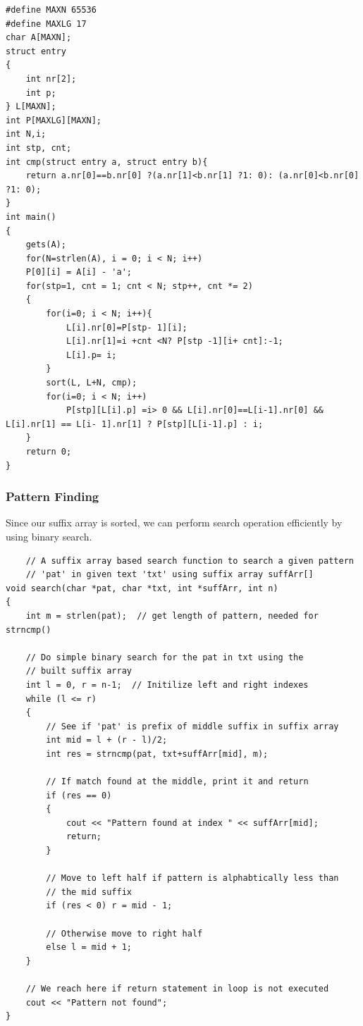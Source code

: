 \documentclass[12pt]{article}
\begin{document}
\begin{verbatim}
#define MAXN 65536
#define MAXLG 17
char A[MAXN];
struct entry
{
    int nr[2];
    int p;
} L[MAXN];
int P[MAXLG][MAXN];
int N,i;
int stp, cnt;
int cmp(struct entry a, struct entry b){
    return a.nr[0]==b.nr[0] ?(a.nr[1]<b.nr[1] ?1: 0): (a.nr[0]<b.nr[0] ?1: 0);
}
int main()
{
    gets(A);
    for(N=strlen(A), i = 0; i < N; i++)
    P[0][i] = A[i] - 'a';
    for(stp=1, cnt = 1; cnt < N; stp++, cnt *= 2)
    {
        for(i=0; i < N; i++){
            L[i].nr[0]=P[stp- 1][i];
            L[i].nr[1]=i +cnt <N? P[stp -1][i+ cnt]:-1;
            L[i].p= i;
        }
        sort(L, L+N, cmp);
        for(i=0; i < N; i++)
            P[stp][L[i].p] =i> 0 && L[i].nr[0]==L[i-1].nr[0] && L[i].nr[1] == L[i- 1].nr[1] ? P[stp][L[i-1].p] : i;
    }
    return 0;
}

\end{verbatim}

        \subsubsection{Pattern Finding}
        
        Since our suffix array is sorted, we can perform search operation efficiently by using binary search.
        
\begin{verbatim}
    // A suffix array based search function to search a given pattern 
    // 'pat' in given text 'txt' using suffix array suffArr[] 
void search(char *pat, char *txt, int *suffArr, int n) 
{ 
    int m = strlen(pat);  // get length of pattern, needed for strncmp() 
  
    // Do simple binary search for the pat in txt using the 
    // built suffix array 
    int l = 0, r = n-1;  // Initilize left and right indexes 
    while (l <= r) 
    { 
        // See if 'pat' is prefix of middle suffix in suffix array 
        int mid = l + (r - l)/2; 
        int res = strncmp(pat, txt+suffArr[mid], m); 
  
        // If match found at the middle, print it and return 
        if (res == 0) 
        { 
            cout << "Pattern found at index " << suffArr[mid]; 
            return; 
        } 
  
        // Move to left half if pattern is alphabtically less than 
        // the mid suffix 
        if (res < 0) r = mid - 1; 
  
        // Otherwise move to right half 
        else l = mid + 1; 
    } 
  
    // We reach here if return statement in loop is not executed 
    cout << "Pattern not found"; 
} 
\end{verbatim}
\end{document}
